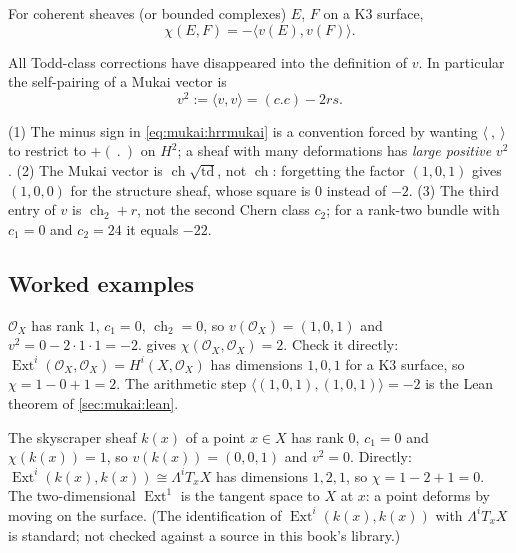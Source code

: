 \begin{theorem}\label{thm:mukai:hrr}
For coherent sheaves (or bounded complexes) $E$, $F$ on a K3 surface,
\begin{equation}\label{eq:mukai:hrrmukai}
  \chi(E,F)=-\langle v(E),v(F)\rangle .
\end{equation}
\end{theorem}
All Todd-class corrections have disappeared into the definition of $v$. In particular the
self-pairing of a Mukai vector is
\begin{equation}\label{eq:mukai:square}
  v^2:=\langle v,v\rangle=(c.c)-2rs .
\end{equation}

\begin{pitfallbox}
(1) The minus sign in \eqref{eq:mukai:hrrmukai} is a convention forced by wanting
$\langle\ ,\ \rangle$ to restrict to $+(\ .\ )$ on $H^2$; a sheaf with many deformations has
\emph{large positive} $v^2$. (2) The Mukai vector is $\operatorname{ch}\sqrt{\operatorname{td}}$,
not $\operatorname{ch}$: forgetting the factor $(1,0,1)$ gives $(1,0,0)$ for the structure sheaf,
whose square is $0$ instead of $-2$. (3) The third entry of $v$ is $\operatorname{ch}_2+r$, not
the second Chern class $c_2$; for a rank-two bundle with $c_1=0$ and $c_2=24$ it equals $-22$.
\end{pitfallbox}

\subsection{Worked examples}\label{sec:mukai:examples}
\begin{example}\label{ex:mukai:O}
$\mathcal O_X$ has rank $1$, $c_1=0$, $\operatorname{ch}_2=0$, so $v(\mathcal O_X)=(1,0,1)$ and
$v^2=0-2\cdot1\cdot1=-2$.  gives $\chi(\mathcal O_X,\mathcal O_X)=2$. Check
it directly: $\operatorname{Ext}^i(\mathcal O_X,\mathcal O_X)=H^i(X,\mathcal O_X)$ has
dimensions $1,0,1$ for a K3 surface, so $\chi=1-0+1=2$. The arithmetic step
$\langle(1,0,1),(1,0,1)\rangle=-2$ is the Lean theorem  of
\cref{sec:mukai:lean}.
\end{example}

\begin{example}[A point]\label{ex:mukai:point}
The skyscraper sheaf $k(x)$ of a point $x\in X$ has rank $0$, $c_1=0$ and $\chi(k(x))=1$, so
$v(k(x))=(0,0,1)$ and $v^2=0$. Directly: $\operatorname{Ext}^i(k(x),k(x))\cong\Lambda^iT_xX$ has
dimensions $1,2,1$, so $\chi=1-2+1=0$. The two-dimensional $\operatorname{Ext}^1$ is the tangent
space to $X$ at $x$: a point deforms by moving on the surface. (The identification of
$\operatorname{Ext}^i(k(x),k(x))$ with $\Lambda^iT_xX$ is standard; not checked against a source
in this book's library.)
\end{example}

